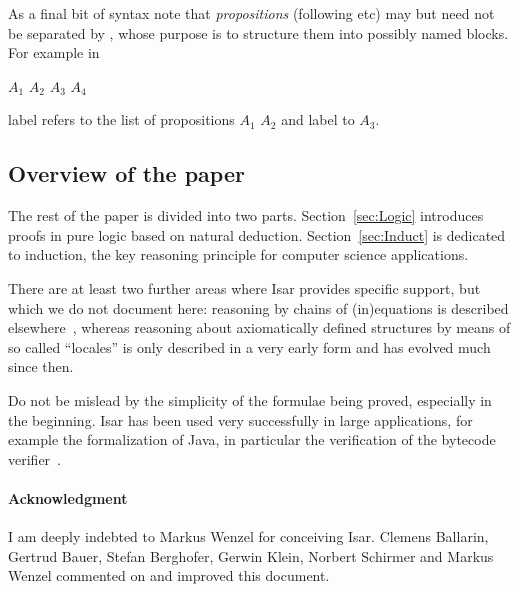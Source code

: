\documentclass[11pt,a4paper]{article}
\begin{document}
As a final bit of syntax note that \emph{propositions} (following
 etc) may but need not be separated by
, whose purpose is to structure them into possibly
named blocks. For example in
\begin{center}
  $A_1$ $A_2$   $A_3$
 $A_4$
\end{center}
label  refers to the list of propositions $A_1$ $A_2$ and
label  to $A_3$.

\subsection{Overview of the paper}

The rest of the paper is divided into two parts.
Section~\ref{sec:Logic} introduces proofs in pure logic based on
natural deduction. Section~\ref{sec:Induct} is dedicated to induction,
the key reasoning principle for computer science applications.

There are at least two further areas where Isar provides specific
support, but which we do not document here: reasoning by chains of
(in)equations is described elsewhere~\cite{BauerW-TPHOL}, whereas
reasoning about axiomatically defined structures by means of so called
``locales'' \cite{BallarinPW-TPHOL} is only described in a very early
form and has evolved much since then.

Do not be mislead by the simplicity of the formulae being proved,
especially in the beginning. Isar has been used very successfully in
large applications, for example the formalization of Java, in
particular the verification of the bytecode verifier~\cite{KleinN-TCS}.




%


{\small
\paragraph{Acknowledgment}
I am deeply indebted to Markus Wenzel for conceiving Isar. Clemens Ballarin,
Gertrud Bauer, Stefan Berghofer, Gerwin Klein, Norbert Schirmer and
Markus Wenzel commented on and improved this document.
}

\begingroup
 \small\raggedright\frenchspacing

\endgroup
\end{document}
